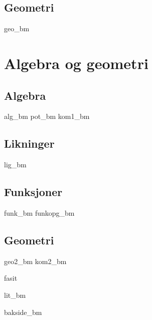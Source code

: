 \chapter{Geometri}
\newpage
{geo_bm}

\part{Algebra og geometri \label{Del2}}
\chapter{Algebra}
\newpage
{alg_bm}
{pot_bm}
\newpage
{kom1_bm}

\chapter{Likninger \label{Likningar}}
\newpage
{lig_bm}

\chapter{Funksjoner \label{Funksjoner}}
{funk_bm}
\opgt
{funkopg_bm}

\chapter{Geometri}
\newpage
{geo2_bm}
\newpage
{kom2_bm}

\newpage
{}
{}
{fasit}

{lit_bm}
{\printindex {}
	}
{bakside_bm}









